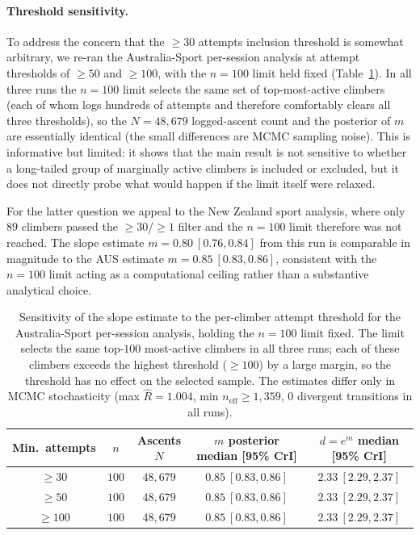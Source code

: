 \documentclass[12pt]{article}
\begin{document}
\paragraph{Threshold sensitivity.} To address the concern that the $\geq\!30$ attempts inclusion threshold is somewhat arbitrary, we re-ran the Australia-Sport per-session analysis at attempt thresholds of $\geq\!50$ and $\geq\!100$, with the $n=100$ limit held fixed (Table~\ref{tab:threshold-sensitivity}). In all three runs the $n=100$ limit selects the same set of top-most-active climbers (each of whom logs hundreds of attempts and therefore comfortably clears all three thresholds), so the $N=48{,}679$ logged-ascent count and the posterior of $m$ are essentially identical (the small differences are MCMC sampling noise). This is informative but limited: it shows that the main result is not sensitive to whether a long-tailed group of marginally active climbers is included or excluded, but it does not directly probe what would happen if the limit itself were relaxed.

For the latter question we appeal to the New Zealand sport analysis, where only $89$ climbers passed the $\geq\!30$/$\geq\!1$ filter and the $n=100$ limit therefore was not reached. The slope estimate $m = 0.80\ [0.76, 0.84]$ from this run is comparable in magnitude to the AUS estimate $m = 0.85\ [0.83, 0.86]$, consistent with the $n=100$ limit acting as a computational ceiling rather than a substantive analytical choice.

\begin{table}
\centering
\begin{tabular}{|c|c|c|c|c|}
\hline
{\bf Min.\ attempts} & {\bf $n$} & {\bf Ascents $N$} & {\bf $m$ posterior median [95\% CrI]} & {\bf $d=e^m$ median [95\% CrI]} \\
\hline
$\geq 30$  & $100$ & $48{,}679$ & $0.85\ [0.83, 0.86]$ & $2.33\ [2.29, 2.37]$ \\
$\geq 50$  & $100$ & $48{,}679$ & $0.85\ [0.83, 0.86]$ & $2.33\ [2.29, 2.37]$ \\
$\geq 100$ & $100$ & $48{,}679$ & $0.85\ [0.83, 0.86]$ & $2.33\ [2.29, 2.37]$ \\
\hline
\end{tabular}
\caption{Sensitivity of the slope estimate to the per-climber attempt threshold for the Australia-Sport per-session analysis, holding the $n=100$ limit fixed. The limit selects the same top-$100$ most-active climbers in all three runs; each of these climbers exceeds the highest threshold ($\geq\!100$) by a large margin, so the threshold has no effect on the selected sample. The estimates differ only in MCMC stochasticity (max $\hat{R} = 1.004$, min $n_{\mathrm{eff}} \geq 1{,}359$, $0$ divergent transitions in all runs).}
\label{tab:threshold-sensitivity}
\end{table}
\end{document}
